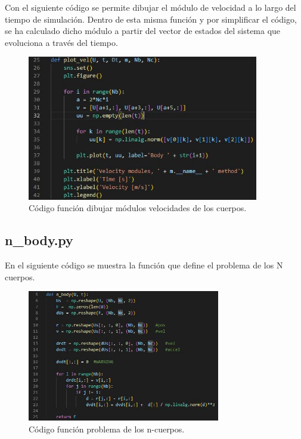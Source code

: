 \documentclass[12pt,a4paper]{article}
\begin{document}
Con el siguiente código se permite dibujar el módulo de velocidad a lo largo del tiempo de simulación. Dentro de esta misma función y por simplificar el código, se ha calculado dicho módulo a partir del vector de estados del sistema que evoluciona a través del tiempo. 
\begin{figure}[H]
	\centering
	\includegraphics[width=0.9\textwidth]{FIGURES/mil5/codigo/plot_n_body_2.JPG}
	\caption{Código función dibujar módulos velocidades de los cuerpos.}
	\label{plot_n_body_2}
\end{figure}


\subsection{n\_body.py}
En el siguiente código se muestra la función que define el problema de los N cuerpos. 
\begin{figure}[H]
	\centering
	\includegraphics[width=0.75\textwidth]{FIGURES/mil5/codigo/n_body_1.JPG}
	\caption{Código función problema de los n-cuerpos.}
	\label{n_body_1}
\end{figure}
\end{document}
